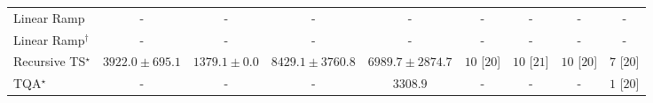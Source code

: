 \begin{tabular}{l|cccc|cccc|}
Linear Ramp & {\cellcolor[HTML]{000000}} \color[HTML]{F1F1F1} {\cellcolor{white}} \color{black} - & {\cellcolor[HTML]{000000}} \color[HTML]{F1F1F1} {\cellcolor{white}} \color{black} - & {\cellcolor[HTML]{000000}} \color[HTML]{F1F1F1} {\cellcolor{white}} \color{black} - & {\cellcolor[HTML]{000000}} \color[HTML]{F1F1F1} {\cellcolor{white}} \color{black} - & {\cellcolor[HTML]{000000}} \color[HTML]{F1F1F1} {\cellcolor{white}} \color{black} - & {\cellcolor[HTML]{000000}} \color[HTML]{F1F1F1} {\cellcolor{white}} \color{black} - & {\cellcolor[HTML]{000000}} \color[HTML]{F1F1F1} {\cellcolor{white}} \color{black} - & {\cellcolor[HTML]{000000}} \color[HTML]{F1F1F1} {\cellcolor{white}} \color{black} - \\
Linear Ramp$^\dagger$ & {\cellcolor[HTML]{000000}} \color[HTML]{F1F1F1} {\cellcolor{white}} \color{black} - & {\cellcolor[HTML]{000000}} \color[HTML]{F1F1F1} {\cellcolor{white}} \color{black} - & {\cellcolor[HTML]{000000}} \color[HTML]{F1F1F1} {\cellcolor{white}} \color{black} - & {\cellcolor[HTML]{000000}} \color[HTML]{F1F1F1} {\cellcolor{white}} \color{black} - & {\cellcolor[HTML]{000000}} \color[HTML]{F1F1F1} {\cellcolor{white}} \color{black} - & {\cellcolor[HTML]{000000}} \color[HTML]{F1F1F1} {\cellcolor{white}} \color{black} - & {\cellcolor[HTML]{000000}} \color[HTML]{F1F1F1} {\cellcolor{white}} \color{black} - & {\cellcolor[HTML]{000000}} \color[HTML]{F1F1F1} {\cellcolor{white}} \color{black} - \\
Recursive TS$^\star$ & {\cellcolor[HTML]{9CB9D9}} \color[HTML]{000000} $3922.0\pm 695.1$ & {\cellcolor[HTML]{F6EFF7}} \color[HTML]{000000} $1379.1\pm 0.0$ & {\cellcolor[HTML]{023858}} \color[HTML]{F1F1F1} $8429.1\pm 3760.8$ & {\cellcolor[HTML]{0566A0}} \color[HTML]{F1F1F1} $6989.7\pm 2874.7$ & {\cellcolor[HTML]{49006A}} \color[HTML]{F1F1F1} $10$ [$20$] & {\cellcolor[HTML]{49006A}} \color[HTML]{F1F1F1} $10$ [$21$] & {\cellcolor[HTML]{49006A}} \color[HTML]{F1F1F1} $10$ [$20$] & {\cellcolor[HTML]{CD238F}} \color[HTML]{F1F1F1} $7$ [$20$] \\
TQA$^\star$ & {\cellcolor[HTML]{000000}} \color[HTML]{F1F1F1} {\cellcolor{white}} \color{black} - & {\cellcolor[HTML]{000000}} \color[HTML]{F1F1F1} {\cellcolor{white}} \color{black} - & {\cellcolor[HTML]{000000}} \color[HTML]{F1F1F1} {\cellcolor{white}} \color{black} - & {\cellcolor[HTML]{B9C6E0}} \color[HTML]{000000} $3308.9$ & {\cellcolor[HTML]{000000}} \color[HTML]{F1F1F1} {\cellcolor{white}} \color{black} - & {\cellcolor[HTML]{000000}} \color[HTML]{F1F1F1} {\cellcolor{white}} \color{black} - & {\cellcolor[HTML]{000000}} \color[HTML]{F1F1F1} {\cellcolor{white}} \color{black} - & {\cellcolor[HTML]{FFF7F3}} \color[HTML]{000000} $1$ [$20$] \\

\end{tabular}
